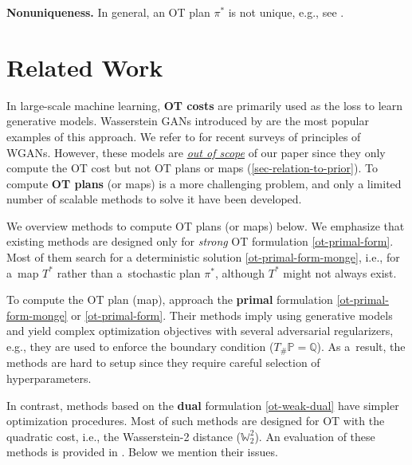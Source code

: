 \documentclass{article} %
\begin{document}
\vspace{-1mm}\textbf{Nonuniqueness.} In general, an OT plan $\pi^{*}$ is not unique, e.g., see \citep[Remark 2.3]{peyre2019computational}.

\vspace{-3mm}\section{Related Work}
\label{sec-related-work}
\vspace{-2.6mm}In large-scale machine learning, \textbf{OT costs} are primarily used as the loss to learn generative models. Wasserstein GANs introduced by \citep{arjovsky2017wasserstein,gulrajani2017improved} are the most popular examples of this approach. We refer to \citep{korotin2022kantorovich,korotin2021neural} for recent surveys of principles of WGANs. However, these models are \underline{\textit{out of scope}} of our paper since they only compute the OT cost but not OT plans or maps (\wasyparagraph\ref{sec-relation-to-prior}). To compute  \textbf{OT plans} (or maps) is a more challenging problem, and only a limited number of scalable methods to solve it have been developed.

\vspace{-0.7mm}We overview  methods to compute OT plans (or maps) below. We emphasize that existing methods are designed only for \textit{strong} OT formulation \eqref{ot-primal-form}. Most of them search for a deterministic solution \eqref{ot-primal-form-monge}, i.e., for a~map $T^{*}$ rather than a~stochastic plan $\pi^{*}$, although $T^{*}$ might not always exist.

\vspace{-0.7mm}To compute the OT plan (map), \citep{lu2020large,xie2019scalable} approach the \textbf{primal} formulation \eqref{ot-primal-form-monge} or \eqref{ot-primal-form}. Their methods imply using generative models and yield complex optimization objectives with several adversarial regularizers, e.g., they are used to enforce the boundary condition ($T_{\#}\mathbb{P}=\mathbb{Q}$). As a~result, the methods are hard to setup  since they require careful selection of hyperparameters.

\vspace{-0.7mm}In contrast, methods based on the \textbf{dual} formulation \eqref{ot-weak-dual} have simpler optimization procedures. Most of such methods are designed for OT with the quadratic cost, i.e., the Wasserstein-2 distance ($\mathbb{W}_{2}^{2}$). An evaluation of these methods is provided in \citep{korotin2021neural}. Below we mention their issues.
\end{document}
